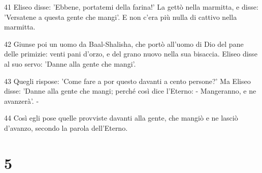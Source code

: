 \par 41 Eliseo disse: 'Ebbene, portatemi della farina!' La gettò nella marmitta, e disse: 'Versatene a questa gente che mangi'. E non c'era più nulla di cattivo nella marmitta.
\par 42 Giunse poi un uomo da Baal-Shalisha, che portò all'uomo di Dio del pane delle primizie: venti pani d'orzo, e del grano nuovo nella sua bisaccia. Eliseo disse al suo servo: 'Danne alla gente che mangi'.
\par 43 Quegli rispose: 'Come fare a por questo davanti a cento persone?' Ma Eliseo disse: 'Danne alla gente che mangi; perché così dice l'Eterno: - Mangeranno, e ne avanzerà'. -
\par 44 Così egli pose quelle provviste davanti alla gente, che mangiò e ne lasciò d'avanzo, secondo la parola dell'Eterno.

\chapter{5}

